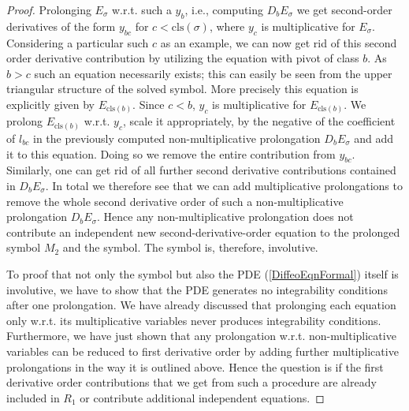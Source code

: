 \begin{proof}
Prolonging $E_{\sigma}$ w.r.t. such a $y_b$, i.e., computing $D_bE_{\sigma}$ we get second-order derivatives of the form $y_{bc}$ for $c < \mathrm{cls}(\sigma)$, where $y_c$ is multiplicative for $E_{\sigma}$. Considering a particular such $c$ as an example, we can now get rid of this second order derivative contribution by utilizing the equation with pivot of class $b$. As $b>c$ such an equation necessarily exists; this can easily be seen from the upper triangular structure of the solved symbol. More precisely this equation is explicitly given by $E_{\mathrm{cls}(b)}$.
Since $c<b$, $y_c$ is multiplicative for $E_{\mathrm{cls}(b)}$. We prolong $E_{\mathrm{cls}(b)}$ w.r.t. $y_c$, scale it appropriately, by the negative of the coefficient of $l_{bc}$ in the previously computed non-multiplicative prolongation $D_bE_{\sigma}$ and add it to this equation. Doing so we remove the entire contribution from $y_{bc}$. Similarly, one can get rid of all further second derivative contributions contained in $D_bE_{\sigma}$. In total we therefore see that we can add multiplicative prolongations to remove the whole second derivative order of such a non-multiplicative prolongation $D_bE_{\sigma}$.
Hence any non-multiplicative prolongation does not contribute an independent new second-derivative-order equation to the prolonged symbol $M_2$ and the symbol. The symbol is, therefore, involutive. 

To proof that not only the symbol but also the PDE (\ref{DiffeoEqnFormal}) itself is involutive, we have to show that the PDE generates no integrability conditions after one prolongation. We have already discussed that prolonging each equation only w.r.t. its multiplicative variables never produces integrability conditions. Furthermore, we have just shown that any prolongation w.r.t. non-multiplicative variables can be reduced to first derivative order by adding further multiplicative prolongations in the way it is outlined above. Hence the question is if the first derivative order contributions that we get from such a procedure are already included in $R_1$ or contribute additional independent equations. 


\end{proof}
